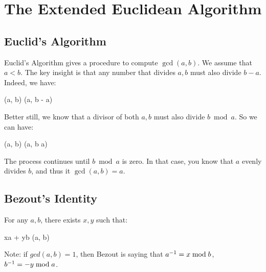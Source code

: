 \section{The Extended Euclidean Algorithm}

\subsection{Euclid's Algorithm}

Euclid's Algorithm gives a procedure to compute $\gcd(a, b)$. We assume
that $a < b$. The key insight is that any number that divides $a, b$
must also divide $b - a$. Indeed, we have:

\begin{nedqn}
  \gcd(a, b)
\eqcol
  \gcd(a, b - a)
\end{nedqn}

Better still, we know that a divisor of both $a, b$ must also divide $b
\bmod a$. So we can have:

\begin{nedqn}
  \gcd(a, b)
\eqcol
  \gcd(a, b \bmod a)
\end{nedqn}

The process continues until $b \bmod a$ is zero. In that case, you know
that $a$ evenly divides $b$, and thus it $\gcd(a, b) = a$.

\subsection{Bezout's Identity}

\begin{theorem}
  For any $a, b$, there exists $x, y$ such that:

  \begin{nedqn}
    xa + yb
  \eqcol
    \gcd(a, b)
  \end{nedqn}
\end{theorem}

Note: if $gcd(a, b) = 1$, then Bezout is saying that ${a}^{-1} = x \bmod
b$, ${b}^{-1} = -y \bmod a$.

